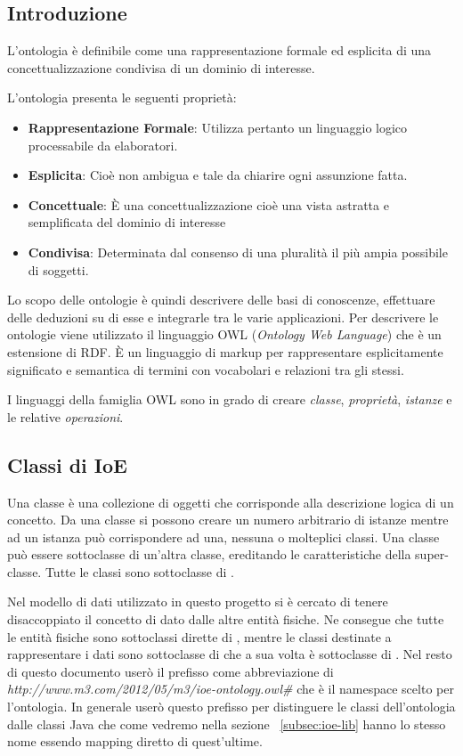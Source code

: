 \subsection{Introduzione}

L'ontologia è definibile come una rappresentazione formale ed esplicita di una concettualizzazione condivisa di un dominio di interesse.

L'ontologia presenta le seguenti proprietà:

\begin{itemize}
	\item \textbf{Rappresentazione Formale}: Utilizza pertanto un linguaggio logico processabile da elaboratori.
	\item \textbf{Esplicita}: Cioè non ambigua e tale da chiarire ogni assunzione fatta.
	\item \textbf{Concettuale}: È una concettualizzazione cioè una vista astratta e semplificata del dominio di interesse
	\item \textbf{Condivisa}: Determinata dal consenso di una pluralità il più ampia possibile di soggetti.
\end{itemize}

Lo scopo delle ontologie è quindi descrivere delle basi di conoscenze, effettuare delle deduzioni su di esse e integrarle tra le varie applicazioni. Per descrivere le ontologie viene utilizzato il linguaggio OWL (\emph{Ontology Web Language}) che è un estensione di RDF. È un linguaggio di markup per rappresentare esplicitamente significato e semantica di termini con vocabolari e relazioni tra gli stessi.

I linguaggi della famiglia OWL sono in grado di creare \emph{classe}, \emph{proprietà}, \emph{istanze} e le relative \emph{operazioni}.


\subsection{Classi di IoE}

Una classe è una collezione di oggetti che corrisponde alla descrizione logica di un concetto. Da una classe si possono creare un numero arbitrario di istanze mentre ad un istanza può corrispondere ad una, nessuna o molteplici classi.\newline
Una classe può essere sottoclasse di un'altra classe, ereditando le caratteristiche della super-classe. Tutte le classi sono sottoclasse di .

Nel modello di dati utilizzato in questo progetto si è cercato di tenere disaccoppiato il concetto di dato dalle altre entità fisiche. Ne consegue che tutte le entità fisiche sono sottoclassi dirette di , mentre le classi destinate a rappresentare i dati sono sottoclasse di  che a sua volta è sottoclasse di .\newline
Nel resto di questo documento userò il prefisso  come abbreviazione di \emph{http://www.m3.com/2012/05/m3/ioe-ontology.owl\#} che è il namespace scelto per l'ontologia. In generale userò questo prefisso per distinguere le classi dell'ontologia dalle classi Java che come vedremo nella sezione ~\ref{subsec:ioe-lib} hanno lo stesso nome essendo mapping diretto di quest'ultime.


